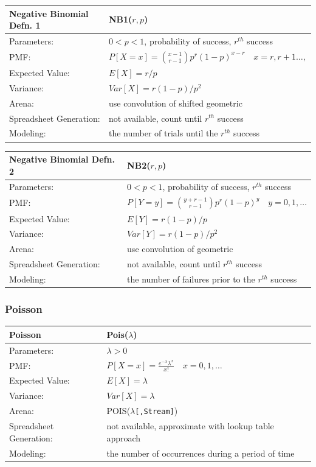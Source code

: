 \documentclass[
]{book}
\theoremstyle{definition}
\theoremstyle{definition}
\theoremstyle{definition}
\theoremstyle{definition}
\theoremstyle{remark}
\begin{document}
\begin{longtable}[]{@{}ll@{}}
\toprule
\textbf{Negative Binomial Defn. 1} & NB1(\(r,p\)) \\
\midrule
\endhead
Parameters: & \(0 < p < 1\), probability of success, \(r^{th}\) success \\
PMF: & \(P[X=x] = \binom{x-1}{r-1}p^{r}(1-p)^{x-r} \quad x=r,r+1\ldots,\) \\
Expected Value: & \(E[X] = r/p\) \\
Variance: & \(Var[X] = r(1-p)/p^2\) \\
Arena: & use convolution of shifted geometric \\
Spreadsheet Generation: & not available, count until \(r^{th}\) success \\
Modeling: & the number of trials until the \(r^{th}\) success \\
\bottomrule
\end{longtable}

\begin{longtable}[]{@{}ll@{}}
\toprule
\textbf{Negative Binomial Defn. 2} & NB2(\(r,p\)) \\
\midrule
\endhead
Parameters: & \(0 < p < 1\), probability of success, \(r^{th}\) success \\
PMF: & \(P[Y=y] = \binom{y+r-1}{r-1}p^{r}(1-p)^{y} \quad y=0,1,\ldots\) \\
Expected Value: & \(E[Y] = r(1-p)/p\) \\
Variance: & \(Var[Y] = r(1-p)/p^2\) \\
Arena: & use convolution of geometric \\
Spreadsheet Generation: & not available, count until \(r^{th}\) success \\
Modeling: & the number of failures prior to the \(r^{th}\) success \\
\bottomrule
\end{longtable}

\hypertarget{poisson}{%
\subsubsection*{Poisson}\label{poisson}}


\begin{longtable}[]{@{}ll@{}}
\toprule
\textbf{Poisson} & Pois(\(\lambda\)) \\
\midrule
\endhead
Parameters: & \(\lambda > 0\) \\
PMF: & \(P[X=x] = \frac{e^{-\lambda}\lambda^{x}}{x!} \quad x = 0, 1, \ldots\) \\
Expected Value: & \(E[X] = \lambda\) \\
Variance: & \(Var[X] = \lambda\) \\
Arena: & POIS(\(\lambda\)\texttt{{[},Stream{]}}) \\
Spreadsheet Generation: & not available, approximate with lookup table approach \\
Modeling: & the number of occurrences during a period of time \\
\bottomrule
\end{longtable}
\end{document}
